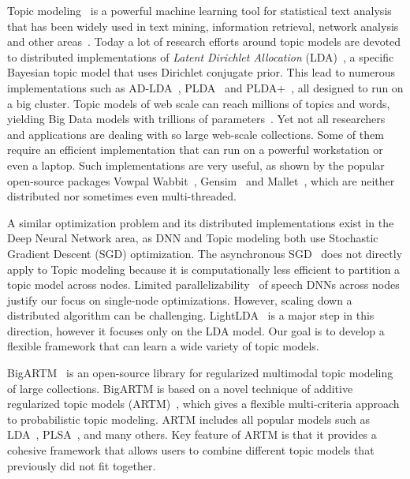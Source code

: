 \documentclass[russian,english]{llncs}
\begin{document}
Topic modeling~\cite{blei12ptm} is a powerful machine learning tool for statistical text analysis
that has been widely used in text mining, information retrieval, network analysis and other areas~\cite{daud10knowledge}.
Today a lot of research efforts around topic models are devoted to distributed implementations of
\emph{Latent Dirichlet Allocation} (LDA)~\cite{blei03latent},
a specific Bayesian topic model that uses Dirichlet conjugate prior.
This lead to numerous implementations such as
AD-LDA~\cite{newman09distributed}, PLDA~\cite{wang09plda} and PLDA{+}~\cite{liu11plda},
all designed to run on a big cluster.
Topic models of web scale can reach millions of topics and words,
yielding Big Data models with trillions of parameters~\cite{yuan15lightlda}.
Yet not all researchers and applications are dealing with so large web-scale collections.
Some of them require an efficient implementation that can run on a powerful workstation or even a laptop.
Such implementations are very useful,
as shown by the popular open-source packages
Vowpal Wabbit~\cite{langford07vw}, Gensim~\cite{rehurek10software} and Mallet~\cite{McCallum02mallet},
which are neither distributed nor sometimes even multi-threaded.

A similar optimization problem and its distributed implementations exist
in the Deep Neural Network area, as
DNN and Topic modeling both use Stochastic Gradient Descent (SGD) optimization.
The asynchronous SGD~\cite{dean2012sgd} does not directly apply to Topic modeling because
it is computationally less efficient to partition a topic model across nodes.
Limited parallelizability~\cite{seide2014sgd} of speech DNNs across nodes justify our focus on single-node optimizations.
However, scaling down a distributed algorithm can be challenging.
LightLDA~\cite{yuan15lightlda} is a major step in this direction,
however it focuses only on the LDA model.
Our goal is to develop a flexible framework that can learn a wide variety of topic models.

BigARTM~\cite{vfardi15aist} is an open-source library for
regularized multimodal topic modeling of large collections.
BigARTM is based on a novel technique of additive regularized topic models (ARTM)~\cite{voron14dan-eng,voron15mlj,voron15nonbayesian},
which gives a flexible multi-criteria approach to probabilistic topic modeling.
ARTM includes all popular models such as 
LDA~\cite{blei03latent}, 
PLSA~\cite{hofmann99plsi},
and many others.
Key feature of ARTM is that it provides a cohesive framework that allows users to combine
different topic models that previously did not fit together.
\end{document}
